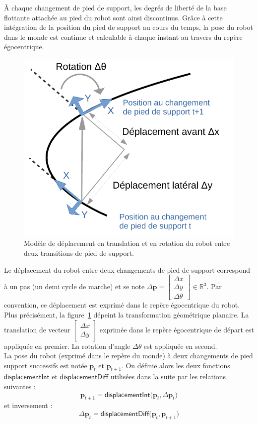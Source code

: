 À chaque changement de pied de support, les degrés de liberté de la base 
flottante attachée au pied du robot sont ainsi discontinus.
Grâce à cette intégration de la position du pied de support au cours du temps, 
la pose du robot dans le monde est continue et calculable à chaque 
instant au travers du repère égocentrique.\\

\begin{figure}[htb]
    \begin{center}
        \includegraphics[type=pdf,ext=.pdf,read=.pdf,width=0.6\linewidth]{../schema/footstep}
        \caption{\label{fig:footstep}
            Modèle de déplacement en translation et en rotation du robot 
            entre deux transitions de pied de support.}
    \end{center}
\end{figure}

Le déplacement du robot entre deux changements de pied 
de support correspond à un pas (un demi cycle de marche) 
et se note 
$\Delta \bm{p} = \begin{bmatrix}\Delta x \\ \Delta y \\ \Delta \theta\end{bmatrix} \in \mathbb{R}^3$.
Par convention, ce déplacement est exprimé dans le repère
égocentrique du robot.
Plus précisément, la figure~\ref{fig:footstep} dépeint la transformation géométrique planaire.
La translation de vecteur $\begin{bmatrix}\Delta x \\ \Delta y\end{bmatrix}$ exprimée dans le
repère égocentrique de départ est appliquée en premier. 
La rotation d'angle $\Delta \theta$ est appliquée en second.\\

La pose du robot (exprimé dans le repère du monde) à deux changements de pied 
support successifs est notée $\bm{p}_{t}$ et $\bm{p}_{t+1}$.
On définie alors les deux fonctions $\mathsf{displacementInt}$ et $\mathsf{displacementDiff}$
utilisées dans la suite par les relations suivantes :
$$
\bm{p}_{t+1} = \mathsf{displacementInt}\big(\bm{p}_{t}, \Delta \bm{p}_{t}\big)
$$
et inversement :
$$
\Delta \bm{p}_{t} = \mathsf{displacementDiff}\big(\bm{p}_{t}, \bm{p}_{t+1}\big)
$$

